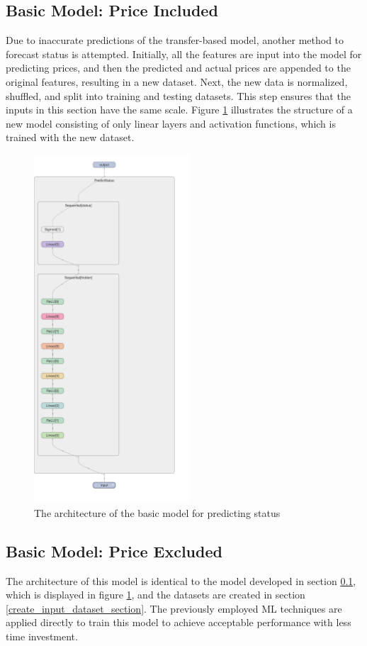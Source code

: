 \documentclass[12pt,twoside]{report}
\begin{document}
\subsection{Basic Model: Price Included}
\label{basic_status_include}
Due to inaccurate predictions of the transfer-based model, another method to forecast status is attempted. Initially, all the features are input into the model for predicting prices, and then the predicted and actual prices are appended to the original features, resulting in a new dataset. Next, the new data is normalized, shuffled, and split into training and testing datasets. This step ensures that the inputs in this section have the same scale. Figure \ref{basic_status_layout} illustrates the structure of a new model consisting of only linear layers and activation functions, which is trained with the new dataset.

\begin{figure}[!htbp]
	\centering
	\includegraphics[height=13cm]{basic_status_layout}
	\caption{The architecture of the basic model for predicting status}
	\label{basic_status_layout}
\end{figure}

\subsection{Basic Model: Price Excluded}
The architecture of this model is identical to the model developed in section \ref{basic_status_include}, which is displayed in figure \ref{basic_status_layout}, and the datasets are created in section \ref{create_input_dataset_section}. The previously employed ML techniques are applied directly to train this model to achieve acceptable performance with less time investment. 
\end{document}
